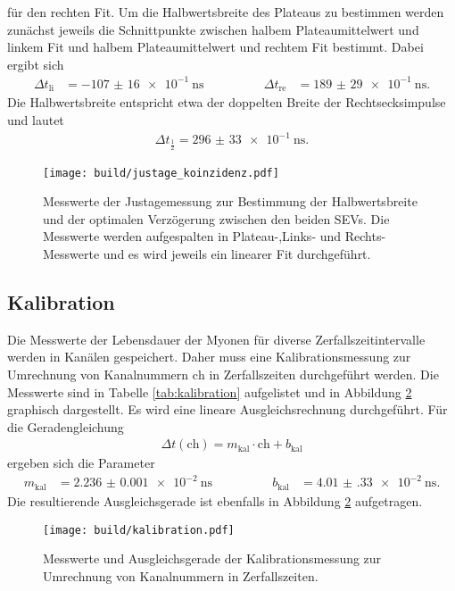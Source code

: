 für den rechten Fit. Um die Halbwertsbreite des Plateaus zu bestimmen werden zunächst jeweils die Schnittpunkte zwischen
halbem Plateaumittelwert und linkem Fit und halbem Plateaumittelwert und rechtem Fit bestimmt. Dabei ergibt sich
\begin{align}
  \Delta t_\text{li} &= \SI{-107(16)e-1}{\nano\second} \qquad \qquad & \Delta t_\text{re} &= \SI{189(29)e-1}{\nano\second}.
\end{align}
Die Halbwertsbreite entspricht etwa der doppelten Breite der Rechtsecksimpulse und lautet
\begin{align}
  \Delta t_{\frac12} = \SI{296(33)e-1}{\nano\second}.
\end{align}

\begin{figure}
  \centering
  \texttt{[image: build/justage\_koinzidenz.pdf]}
  \caption{Messwerte der Justagemessung zur Bestimmung der Halbwertsbreite und der optimalen Verzögerung zwischen den beiden SEVs.
  Die Messwerte werden aufgespalten in Plateau-,Links- und Rechts-Messwerte und es wird jeweils ein linearer Fit durchgeführt.}
  \label{fig:justage}
\end{figure}

\subsection{Kalibration}
\label{sec:kalibration}

Die Messwerte der Lebensdauer der Myonen für diverse Zerfallszeitintervalle werden in Kanälen gespeichert.
Daher muss eine Kalibrationsmessung zur Umrechnung von Kanalnummern $\text{ch}$ in Zerfallszeiten
durchgeführt werden. Die Messwerte sind in Tabelle \ref{tab:kalibration} aufgelistet
und in Abbildung \ref{fig:kalibration} graphisch dargestellt. Es wird eine lineare Ausgleichsrechnung
durchgeführt. Für die Geradengleichung
\begin{align}
  \Delta t (\text{ch}) = m_\text{kal} \cdot \text{ch} + b_\text{kal}
\end{align}
ergeben sich die Parameter
\begin{align}
  m_\text{kal} &= \SI{2.236(1)e-2}{\nano\second} \qquad \qquad &b_\text{kal} &= \SI{4.01(33)e-2}{\nano\second}.
\end{align}
Die resultierende Ausgleichsgerade ist ebenfalls in Abbildung \ref{fig:kalibration} aufgetragen.

\begin{figure}
  \centering
  \texttt{[image: build/kalibration.pdf]}
  \caption{Messwerte und Ausgleichsgerade der Kalibrationsmessung zur Umrechnung von Kanalnummern in Zerfallszeiten.}
  \label{fig:kalibration}
\end{figure}

